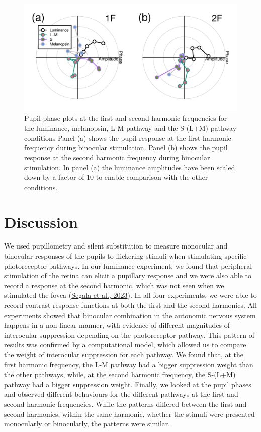 \documentclass[
]{article}
\begin{document}
\begin{figure}

{\centering \includegraphics{Figures/phaseplots} 

}

\caption{Pupil phase plots at the first and second harmonic frequencies for the luminance, melanopsin, L-M pathway and the S-(L+M) pathway conditions Panel (a) shows the pupil response at the first harmonic frequency during binocular stimulation. Panel (b) shows the pupil response at the second harmonic frequency during binocular stimulation. In panel (a) the luminance amplitudes have been scaled down by a factor of 10 to enable comparison with the other conditions.}\label{fig:phaseplots}
\end{figure}

\hypertarget{discussion}{%
\section{Discussion}\label{discussion}}

We used pupillometry and silent substitution to measure monocular and binocular responses of the pupils to flickering stimuli when stimulating specific photoreceptor pathways. In our luminance experiment, we found that peripheral stimulation of the retina can elicit a pupillary response and we were also able to record a response at the second harmonic, which was not seen when we stimulated the fovea (\protect\hyperlink{ref-Segala2023}{Segala et al., 2023}). In all four experiments, we were able to record contrast response functions at both the first and the second harmonics. All experiments showed that binocular combination in the autonomic nervous system happens in a non-linear manner, with evidence of different magnitudes of interocular suppression depending on the photoreceptor pathway. This pattern of results was confirmed by a computational model, which allowed us to compare the weight of interocular suppression for each pathway. We found that, at the first harmonic frequency, the L-M pathway had a bigger suppression weight than the other pathways, while, at the second harmonic frequency, the S-(L+M) pathway had a bigger suppression weight. Finally, we looked at the pupil phases and observed different behaviours for the different pathways at the first and second harmonic frequencies. While the patterns differed between the first and second harmonics, within the same harmonic, whether the stimuli were presented monocularly or binocularly, the patterns were similar.
\end{document}
